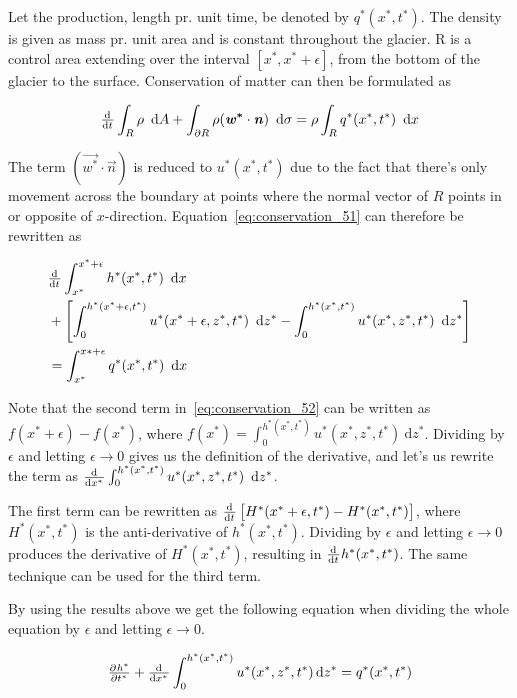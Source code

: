 Let the production, length pr. unit time, be denoted by $q^*(x^*, t^*)$. The density is given as mass pr. unit area and is constant throughout the glacier. R is a control area extending over the interval $\left[x^*, x^* + \epsilon\right]$, from the bottom of the glacier to the surface.  Conservation of matter can then be formulated as

\begin{equation}\label{eq:conservation_51}
     \od{}{t}\int_{R}\rho\ \dif A + \int_{{\partial}R}\rho(\vec{w^*}\cdot\vec{n})\ \dif \sigma = \rho\int_Rq^*(x^*, t^*)\ \dif x
\end{equation}

The term $(\vec{w^*}\cdot\vec{n})$ is reduced to $u^*(x^*, t^*)$ due to the fact that there's only movement across the boundary at points where the normal vector of $R$ points in or opposite of $x$-direction. Equation~\eqref{eq:conservation_51} can therefore be rewritten as

\begin{align}
\begin{split}\label{eq:conservation_52}
    &\od{}{t}\int_{x^*}^{x^* + \epsilon}h^*(x^*, t^*)\ \dif x \\ &+ \left[\int_0^{h^*(x^* + \epsilon, t^*)}u^*(x^* + \epsilon, z^*, t^*)\ \dif{z^*} - \int_0^{h^*(x^*, t^*)}u^*(x^*, z^*, t^*)\ \dif{z^*}\right] \\ 
    &= \int_{x^*}^{x* + \epsilon}q^*(x^*, t^*)\ \dif x
\end{split}
\end{align}


Note that the second term in~\eqref{eq:conservation_52} can be written as $f(x^* + \epsilon) - f(x^*)$, where $f(x^*) = \int_0^{h^*(x^*, t^*)}u^*(x^*, z^*, t^*)\ \mathrm{d}z^*$. Dividing by $\epsilon$ and letting $\epsilon \to 0$ gives us the definition of the derivative, and let's us rewrite the term as $\od{}{{x^*}} \int_0^{h^*(x^*, t^*)} u^*(x^*, z^*, t^*)\  \dif{z^*} $.

The first term can be rewritten as $\od{}{t}\left[H^*(x^* + \epsilon, t^*) - H^*(x^*, t^*)\right]$, where $H^*(x^*, t^*)$ is the anti-derivative of $h^*(x^*, t^*)$. Dividing by $\epsilon$ and letting $\epsilon \to 0$ produces the derivative of $H^*(x^*, t^*)$, resulting in $\od{}{t}h^*(x^*, t^*)$. The same technique can be used for the third term.

By using the results above we get the following equation when dividing the whole equation by $\epsilon$ and letting $\epsilon \to 0$.

\begin{equation}\label{eq:conservation_of_matter}
    \pd{{h^*}}{{t^*}} + \od{}{{x^*}}\int_0^{h^*(x^*, t^*)} u^* (x^*, z^*, t^*) \dif{z^*} = q^*(x^*, t^*)
\end{equation}

